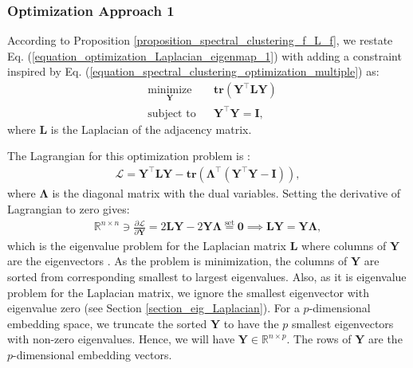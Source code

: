 \documentclass[lang=cn,10pt]{gorgeousnbook}
\numberwithin{equation}{section}%
\numberwithin{figure}{section}%
\begin{document}
\subsubsection{Optimization Approach 1}

According to Proposition \ref{proposition_spectral_clustering_f_L_f}, we restate Eq. (\ref{equation_optimization_Laplacian_eigenmap_1}) with adding a constraint inspired by Eq. (\ref{equation_spectral_clustering_optimization_multiple}) as:
\begin{equation}\label{equation_optimization_Laplacian_eigenmap_2}
\begin{aligned}
& \underset{\boldsymbol{Y}}{\text{minimize}}
& & \textbf{tr}(\boldsymbol{Y}^\top \boldsymbol{L} \boldsymbol{Y}) \\
& \text{subject to}
& & 
\boldsymbol{Y}^\top \boldsymbol{Y} = \boldsymbol{I},
\end{aligned}
\end{equation}
where $\boldsymbol{L}$ is the Laplacian of the adjacency matrix. 

The Lagrangian for this optimization problem is \cite{boyd2004convex}:
\begin{align*}
\mathcal{L} = \boldsymbol{Y}^\top \boldsymbol{L} \boldsymbol{Y} - \textbf{tr}(\boldsymbol{\Lambda}^\top (\boldsymbol{Y}^\top \boldsymbol{Y} - \boldsymbol{I})),
\end{align*}
where $\boldsymbol{\Lambda}$ is the diagonal matrix with the dual variables. Setting the derivative of Lagrangian to zero gives:
\begin{align}
\mathbb{R}^{n \times n} \ni \frac{\partial \mathcal{L}}{\partial \boldsymbol{Y}} = 2 \boldsymbol{L} \boldsymbol{Y} - 2 \boldsymbol{Y} \boldsymbol{\Lambda} \overset{\text{set}}{=} \boldsymbol{0} \implies \boldsymbol{L} \boldsymbol{Y} = \boldsymbol{Y} \boldsymbol{\Lambda},
\end{align}
which is the eigenvalue problem for the Laplacian matrix $\boldsymbol{L}$ where columns of $\boldsymbol{Y}$ are the eigenvectors \cite{ghojogh2019eigenvalue}. 
As the problem is minimization, the columns of $\boldsymbol{Y}$ are sorted from corresponding smallest to largest eigenvalues. Also, as it is eigenvalue problem for the Laplacian matrix, we ignore the smallest eigenvector with eigenvalue zero (see Section \ref{section_eig_Laplacian}). 
For a $p$-dimensional embedding space, we truncate the sorted $\boldsymbol{Y}$ to have the $p$ smallest eigenvectors with non-zero eigenvalues. Hence, we will have $\boldsymbol{Y} \in \mathbb{R}^{n \times p}$. The rows of $\boldsymbol{Y}$ are the $p$-dimensional embedding vectors.
\end{document}
